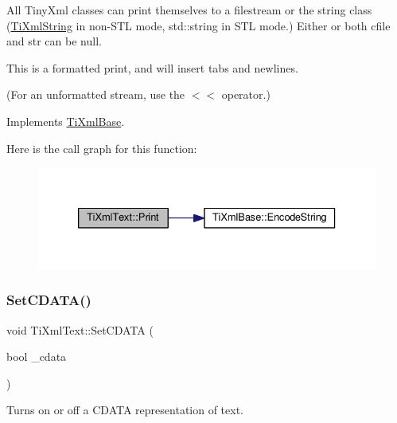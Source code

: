 All Tiny\+Xml classes can print themselves to a filestream or the string class (\hyperlink{class_ti_xml_string}{Ti\+Xml\+String} in non-\/\+S\+TL mode, std\+::string in S\+TL mode.) Either or both cfile and str can be null.

This is a formatted print, and will insert tabs and newlines.

(For an unformatted stream, use the $<$$<$ operator.) 

Implements \hyperlink{class_ti_xml_base_a0de56b3f2ef14c65091a3b916437b512}{Ti\+Xml\+Base}.

Here is the call graph for this function\+:\nopagebreak
\begin{figure}[H]
\begin{center}
\leavevmode
\includegraphics[width=333pt]{class_ti_xml_text_a75f6895906333894e2574cc8cf77ea79_cgraph}
\end{center}
\end{figure}
\mbox{\label{class_ti_xml_text_acb17ff7c5d09b2c839393445a3de5ea9}} 
\subsubsection{\texorpdfstring{Set\+C\+D\+A\+T\+A()}{SetCDATA()}}
{\footnotesize\ttfamily void Ti\+Xml\+Text\+::\+Set\+C\+D\+A\+TA (\begin{DoxyParamCaption}\item[{bool}]{\+\_\+cdata }\end{DoxyParamCaption})\hspace{0.3cm}{\ttfamily [inline]}}



Turns on or off a C\+D\+A\+TA representation of text. 


